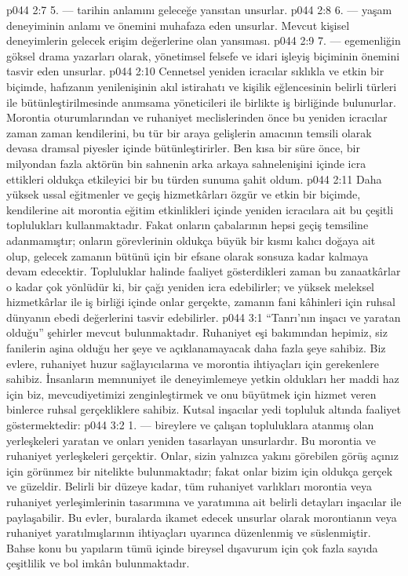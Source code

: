 \vs p044 2:7 5.\bibnobreakspace {} --- tarihin anlamını geleceğe yansıtan unsurlar.
\vs p044 2:8 6.\bibnobreakspace {} --- yaşam deneyiminin anlamı ve önemini muhafaza eden unsurlar. Mevcut kişisel deneyimlerin gelecek erişim değerlerine olan yansıması.
\vs p044 2:9 7.\bibnobreakspace {} --- egemenliğin göksel drama yazarları olarak, yönetimsel felsefe ve idari işleyiş biçiminin önemini tasvir eden unsurlar.
\vs p044 2:10 Cennetsel yeniden icracılar sıklıkla ve etkin bir biçimde, hafızanın yenilenişinin akıl istirahatı ve kişilik eğlencesinin belirli türleri ile bütünleştirilmesinde anımsama yöneticileri ile birlikte iş birliğinde bulunurlar. Morontia oturumlarından ve ruhaniyet meclislerinden önce bu yeniden icracılar zaman zaman kendilerini, bu tür bir araya gelişlerin amacının temsili olarak devasa dramsal piyesler içinde bütünleştirirler. Ben kısa bir süre önce, bir milyondan fazla aktörün bin sahnenin arka arkaya sahnelenişini içinde icra ettikleri oldukça etkileyici bir bu türden sunuma şahit oldum.
\vs p044 2:11 Daha yüksek ussal eğitmenler ve geçiş hizmetkârları özgür ve etkin bir biçimde, kendilerine ait morontia eğitim etkinlikleri içinde yeniden icracılara ait bu çeşitli toplulukları kullanmaktadır. Fakat onların çabalarının hepsi geçiş temsiline adanmamıştır; onların görevlerinin oldukça büyük bir kısmı kalıcı doğaya ait olup, gelecek zamanın bütünü için bir efsane olarak sonsuza kadar kalmaya devam edecektir. Topluluklar halinde faaliyet gösterdikleri zaman bu zanaatkârlar o kadar çok yönlüdür ki, bir çağı yeniden icra edebilirler; ve yüksek meleksel hizmetkârlar ile iş birliği içinde onlar gerçekte, zamanın fani kâhinleri için ruhsal dünyanın ebedi değerlerini tasvir edebilirler.
\vs p044 3:1 “Tanrı’nın inşacı ve yaratan olduğu” şehirler mevcut bulunmaktadır. Ruhaniyet eşi bakımından hepimiz, siz fanilerin aşina olduğu her şeye ve açıklanamayacak daha fazla şeye sahibiz. Biz evlere, ruhaniyet huzur sağlayıcılarına ve morontia ihtiyaçları için gerekenlere sahibiz. İnsanların memnuniyet ile deneyimlemeye yetkin oldukları her maddi haz için biz, mevcudiyetimizi zenginleştirmek ve onu büyütmek için hizmet veren binlerce ruhsal gerçekliklere sahibiz. Kutsal inşacılar yedi topluluk altında faaliyet göstermektedir:
\vs p044 3:2 1.\bibnobreakspace {} --- bireylere ve çalışan topluluklara atanmış olan yerleşkeleri yaratan ve onları yeniden tasarlayan unsurlardır. Bu morontia ve ruhaniyet yerleşkeleri gerçektir. Onlar, sizin yalnızca yakını görebilen görüş açınız için görünmez bir nitelikte bulunmaktadır; fakat onlar bizim için oldukça gerçek ve güzeldir. Belirli bir düzeye kadar, tüm ruhaniyet varlıkları morontia veya ruhaniyet yerleşimlerinin tasarımına ve yaratımına ait belirli detayları inşacılar ile paylaşabilir. Bu evler, buralarda ikamet edecek unsurlar olarak morontianın veya ruhaniyet yaratılmışlarının ihtiyaçları uyarınca düzenlenmiş ve süslenmiştir. Bahse konu bu yapıların tümü içinde bireysel dışavurum için çok fazla sayıda çeşitlilik ve bol imkân bulunmaktadır.
